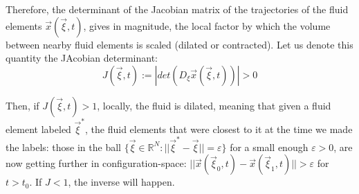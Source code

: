 \documentclass[11pt, a4paper]{article} %
\newcommand{\R}{\mathbb{R}} %
\begin{document}
{Therefore, the determinant of the Jacobian matrix of the trajectories of the fluid elements $\vec{x}(\vec{\xi},t)$, gives in magnitude, the local factor by which the volume between nearby fluid elements is scaled (dilated or contracted). Let us denote this quantity the JAcobian determinant:
\begin{equation}
J(\vec{\xi},t):=|det (D_\xi \vec{x}(\vec{\xi},t))|>0
\end{equation}

Then, if $J(\vec{\xi},t)>1$, locally, the fluid is dilated, meaning that given a fluid element labeled $\vec{\xi}^*$, the fluid elements that were closest to it at the time we made the labels: those in the ball $\{\vec{\xi}\in\R^N:||\vec{\xi}^*-\vec{\xi}||=\varepsilon\}$ for a small enough $\varepsilon>0$, are now getting further in configuration-space: $||\vec{x}(\vec{\xi}_0,t)-\vec{x}(\vec{\xi}_1,t)||>\varepsilon$ for $t>t_0$. If $J<1$, the inverse will happen.\\
 }
\end{document}
